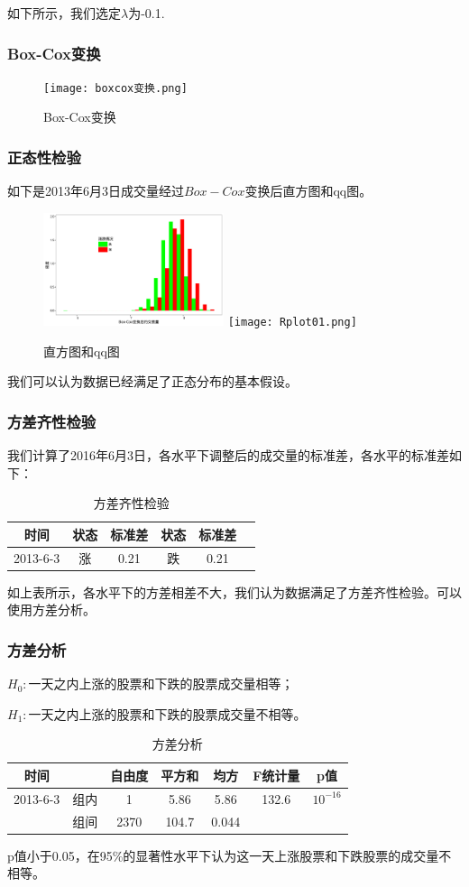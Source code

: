 \documentclass[9pt]{beamer}
\begin{document}
\begin{frame}
如下所示，我们选定$\lambda$为-0.1.
\frametitle{Box-Cox变换}
\begin{figure}
\centering
\texttt{[image: boxcox变换.png]}
\caption{Box-Cox变换}
\end{figure}
\end{frame}

\begin{frame}
\frametitle{正态性检验}
如下是2013年6月3日成交量经过$Box-Cox$变换后直方图和qq图。
\begin{figure}[H]
\centering
\includegraphics[width=150pt]{直方图2.pdf}
\texttt{[image: Rplot01.png]}
\caption{直方图和qq图}
\end{figure}
我们可以认为数据已经满足了正态分布的基本假设。
\end{frame}

\begin{frame}
\frametitle{方差齐性检验}
我们计算了2016年6月3日，各水平下调整后的成交量的标准差，各水平的标准差如下：
\begin{table}[H]
\centering
\caption{方差齐性检验}
\begin{tabular}{cccccc}
\hline
	时间&状态&标准差&状态&标准差\\\hline
	2013-6-3&涨&0.21&跌&0.21\\
	\hline
\end{tabular}
\end{table}
如上表所示，各水平下的方差相差不大，我们认为数据满足了方差齐性检验。可以使用方差分析。
\end{frame}

\begin{frame}
\frametitle{方差分析}
$H_0:$一天之内上涨的股票和下跌的股票成交量相等； 

$H_1:$一天之内上涨的股票和下跌的股票成交量不相等。
\begin{table}[H]
\centering
\caption{方差分析}
\begin{tabular}{ccccccc}
\hline
	  时间   & & 自由度 & 平方和 & 均方 & F统计量 & p值 \\\hline
	2013-6-3& 组内 & 1 & 5.86 & 5.86 & 132.6 & $10^{-16}$ \\
          & 组间 & 2370 & 104.7 & 0.044 & &\\\hline
\end{tabular}
\end{table}
p值小于0.05，在95\%的显著性水平下认为这一天上涨股票和下跌股票的成交量不相等。
\end{frame}
\end{document}
